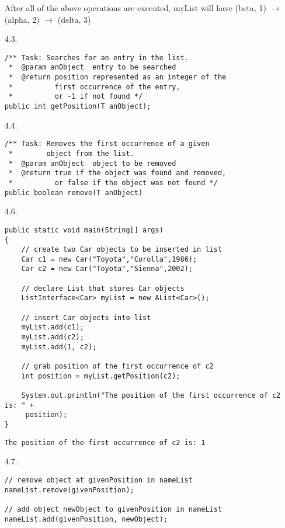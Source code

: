 \documentclass[10pt]{article}
\begin{document}
\begin{enumerate}
			After all of the above operations are executed, myList will have (beta, 1) $\rightarrow$ (alpha, 2) $\rightarrow$ (delta, 3)
			
		\item[4.3.]
			\lstset{language=Java}
			\begin{lstlisting}
/** Task: Searches for an entry in the list.
 *  @param anObject  entry to be searched
 *  @return position represented as an integer of the
 *          first occurrence of the entry,
 *          or -1 if not found */
public int getPosition(T anObject);
			\end{lstlisting}
		
		\item[4.4.]
			\begin{lstlisting}
/** Task: Removes the first occurrence of a given
 *        object from the list.
 *  @param anObject  object to be removed
 *  @return true if the object was found and removed,
 *          or false if the object was not found */
public boolean remove(T anObject)
			\end{lstlisting}
			
		\item[4.6.]
			\begin{lstlisting}
public static void main(String[] args)
{
    // create two Car objects to be inserted in list
    Car c1 = new Car("Toyota","Corolla",1986);
    Car c2 = new Car("Toyota","Sienna",2002);
    
    // declare List that stores Car objects
    ListInterface<Car> myList = new AList<Car>();
    
    // insert Car objects into list
    myList.add(c1);
    myList.add(c2);
    myList.add(1, c2);
    
    // grab position of the first occurrence of c2
    int position = myList.getPosition(c2);
    
    System.out.println("The position of the first occurrence of c2 is: " +
     position);
}
			\end{lstlisting}
			
			\texttt{The position of the first occurrence of c2 is: 1}
		
		\item[4.7.]
			\begin{lstlisting}
// remove object at givenPosition in nameList
nameList.remove(givenPosition);

// add object newObject to givenPosition in nameList
nameList.add(givenPosition, newObject);
			\end{lstlisting}
		

\end{enumerate}
\end{document}
